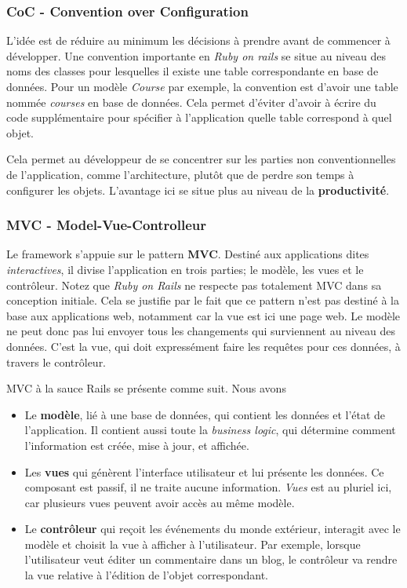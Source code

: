\subsubsection{CoC - Convention over Configuration}
L'idée est de réduire au minimum les décisions à prendre avant de commencer à développer. Une convention importante en \textit{Ruby on rails} se situe au niveau des noms des classes pour lesquelles il existe une table correspondante en base de données. Pour un modèle \textit{Course} par exemple, la convention est d'avoir une table nommée \textit{courses} en base de données. Cela permet d'éviter d'avoir à écrire du code supplémentaire pour spécifier à l'application quelle table correspond à quel objet. 

Cela permet au développeur de se concentrer sur les parties non conventionnelles de l'application, comme l'architecture, plutôt que de perdre son temps à configurer les objets. L'avantage ici se situe plus au niveau de la \textbf{productivité}.
\subsubsection{MVC - Model-Vue-Controlleur}

Le framework s'appuie sur le pattern \textbf{MVC}. Destiné aux applications dites \textit{interactives}, il divise l'application en trois parties; le modèle, les vues et le contrôleur. Notez que \textit{Ruby on Rails} ne respecte pas totalement MVC dans sa conception initiale. Cela se justifie par le fait que ce pattern n'est pas destiné à la base aux applications web, notamment car la vue est ici une page web. Le modèle ne peut donc pas lui envoyer tous les changements qui surviennent au niveau des données. C'est la vue, qui doit expressément faire les requêtes pour ces données, à travers le contrôleur.

MVC à la sauce Rails se présente comme suit. Nous avons

\begin{itemize}
\item Le \textbf{modèle}, lié à une base de données, qui contient les données et l'état de l'application. Il contient aussi toute la \textit{business logic}, qui détermine comment l'information est créée, mise à jour, et affichée.
\item Les \textbf{vues} qui génèrent l'interface utilisateur et lui présente les données. Ce composant est passif, il ne traite aucune information. \textit{Vues} est au pluriel ici, car plusieurs vues peuvent avoir accès au même modèle. 
\item Le \textbf{contrôleur} qui reçoit les événements du monde extérieur, interagit avec le modèle et choisit la vue à afficher à l'utilisateur. Par exemple, lorsque l'utilisateur veut éditer un commentaire dans un blog, le contrôleur va rendre la vue relative à l'édition de l'objet correspondant. 
\end{itemize} 

